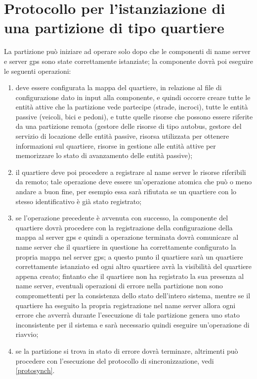 \section{Protocollo per l'istanziazione di una partizione di tipo quartiere}
La partizione può iniziare ad operare solo dopo che le componenti di name
server e server gps sono state correttamente istanziate; la componente dovrà
poi eseguire le seguenti operazioni:
\begin{enumerate}
\item deve essere configurata la mappa del quartiere, in relazione al file di
configurazione dato in input alla componente, e quindi occorre creare tutte le
entità attive che la partizione vede partecipe (strade, incroci), tutte le
entità passive (veicoli, bici e pedoni), e tutte quelle risorse che possono
essere riferite da una partizione remota (gestore delle risorse di tipo
autobus, gestore del servizio di locazione delle entità passive, risorsa
utilizzata per ottenere informazioni sul quartiere, risorse in gestione alle
entità attive per memorizzare lo stato di avanzamento delle entità passive);
\item il quartiere deve poi procedere a registrare al name server le risorse
riferibili da remoto; tale operazione deve essere un'operazione atomica che può
o meno andare a buon fine, per esempio essa sarà rifiutata se un quartiere con
 lo stesso identificativo è già stato registrato;
\item se l'operazione precedente è avvenuta con successo, la componente del
quartiere dovrà procedere con la registrazione della configurazione della mappa
al server gps e quindi a operazione terminata dovrà comunicare al name server
che il quartiere in questione ha correttamente configurato la propria mappa nel
server gps; a questo punto il quartiere sarà un quartiere correttamente
istanziato ed ogni altro quartiere avrà la visibilità del quartiere appena
creato; fintanto che il quartiere non ha registrato la sua presenza al name
server, eventuali operazioni di errore nella partizione non sono compromettenti
per la consistenza dello stato dell'intero sistema, mentre se il quartiere ha
eseguito la propria registrazione nel name server allora ogni errore che
avverrà durante l'esecuzione di tale partizione genera uno stato inconsistente
per il sistema e sarà necessario quindi eseguire un'operazione di riavvio;
\item se la partizione si trova in stato di errore dovrà terminare, altrimenti
può procedere con l'esecuzione del protocollo di sincronizzazione, vedi
\ref{protosynch}.
\end{enumerate}